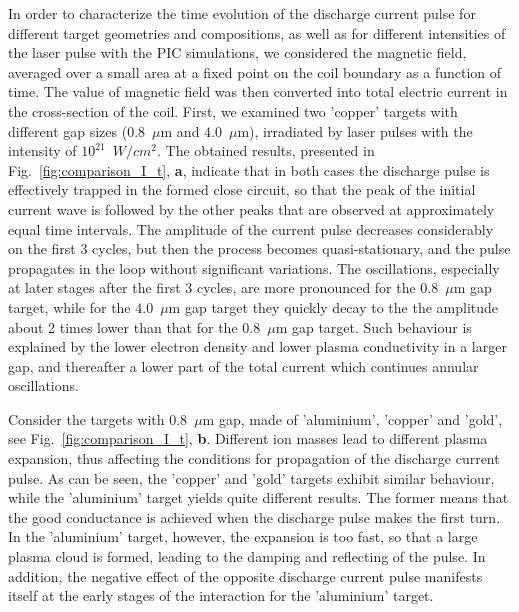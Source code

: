 \documentclass[aps,prl,twocolumn,superscriptaddress]{revtex4-1}
\begin{document}
In order to characterize the time evolution of the discharge current pulse for different target geometries and compositions, as well as for different intensities of the laser pulse with the PIC simulations, we considered the magnetic field, averaged over a small area at a fixed point on the coil boundary as a function of time. The value of magnetic field was then converted into total electric current in the cross-section of the coil. First, we examined two 'copper' targets with different gap sizes ($0.8$~$\mu$m and $4.0$~$\mu$m), irradiated by laser pulses with the intensity of $10^{21}$~$W/cm^2$. The obtained results, presented in Fig.~\ref{fig:comparison_I_t}, \textbf{a}, indicate that in both cases the discharge pulse is effectively trapped in the formed close circuit, so that the peak of the initial current wave is followed by the other peaks that are observed at approximately equal time intervals. The amplitude of the current pulse decreases considerably on the first 3 cycles, but then the process becomes quasi-stationary, and the pulse propagates in the loop without significant variations. The oscillations, especially at later stages after the first 3 cycles, are more pronounced for the 0.8~$\mu$m gap target, while for the $4.0$~$\mu$m gap target they quickly decay to the the amplitude about 2 times lower than that for the $0.8$~$\mu$m gap target. Such behaviour is explained by the lower electron density and lower plasma conductivity in a larger gap, and thereafter a lower part of the total current which continues annular oscillations. 

Consider the targets with 0.8~$\mu$m gap, made of 'aluminium', 'copper' and 'gold', see Fig.~\ref{fig:comparison_I_t}, \textbf{b}. Different ion masses lead to different plasma expansion, thus affecting the conditions for propagation of the discharge current pulse. As can be seen, the 'copper' and 'gold' targets exhibit similar behaviour, while the 'aluminium' target yields quite different results. The former means that the good conductance is achieved when the discharge pulse makes the first turn. In the 'aluminium' target, however, the expansion is too fast, so that a large plasma cloud is formed, leading to the damping and reflecting of the pulse. In addition, the negative effect of the opposite discharge current pulse manifests itself at the early stages of the interaction for the 'aluminium' target. 
\end{document}
